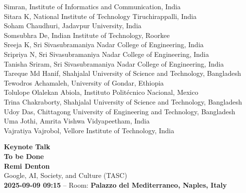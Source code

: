\documentclass[11pt,oneside]{book}
\begin{document}
\begin{description}
              Simran, Institute of Informatics and Communication, India\\
              Sitara K, National Institute of Technology Tiruchirappalli, India\\
              Soham Chaudhuri, Jadavpur University, India\\
              Somsubhra De, Indian Institute of Technology, Roorkee\\
              Sreeja K, Sri Sivasubramaniya Nadar College of Engineering, India\\
              Sripriya N, Sri Sivasubramaniya Nadar College of Engineering, India\\
              Tanisha Sriram, Sri Sivasubramaniya Nadar College of Engineering, India\\
              Tareque Md Hanif, Shahjalal University of Science and Technology, Bangladesh\\
              Tewodros Achamaleh, University of Gondar, Ethiopia\\
              Tolulope Olalekan Abiola, Instituto Politécnico Nacional, Mexico\\
              Trina Chakraborty, Shahjalal University of Science and Technology, Bangladesh\\
              Udoy Das, Chittagong University of Engineering and Technology, Bangladesh\\
              Uma Jothi, Amrita Vishwa Vidyapeetham, India\\
              Vajratiya Vajrobol, Vellore Institute of Technology, India\\
\end{description}
\newpage

  \begin{center}
          {\Large \textbf{Keynote Talk}\\}
      {\LARGE \textbf{To be Done}\\}
        \vspace*{0.5cm}
    \textbf{Remi Denton}\\
        Google, AI, Society, and Culture (TASC)\\
        
        
        \textbf{2025-09-09 09:15} -- 
                Room: \textbf{Palazzo del Mediterraneo, Naples, Italy}\\
        
  \end{center}
\end{document}
